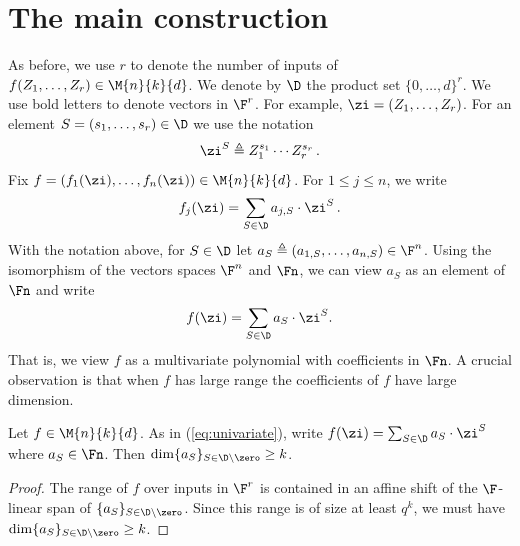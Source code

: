  \section{The main construction}\label{sec:main}
As before, we use $r$ to denote the number of inputs of $f(Z_1,\ldots,Z_r)\in\M{n}{k}{d}$.
We denote by $\D$ the product set $\{0,\ldots,d\}^r$.
We use bold letters to denote vectors in $\F^r$.
For example, $\zi = (Z_1,\ldots,Z_r)$.
For an element $S=(s_1,\ldots,s_r)\in \D$ we use the notation
\[\zi^{S}\triangleq Z_1^{s_1}\cdots Z_r^{s_r}\,.\]
Fix $f=(f_1(\zi),\ldots,f_n(\zi))\in \M{n}{k}{d}$.
For $1\leq j\leq n$, we write
\[f_j(\zi) = \sum_{S \in \D} a_{j,S} \cdot \zi^S\,.\]
With the notation above, for $S\in \D$ let $a_S\triangleq
(a_{1,S},\ldots,a_{n,S})\in \F^n$. Using the isomorphism of the
vectors spaces $\F^n$ and $\Fn$, we can view $a_S$ as an element
of $\Fn$ and write
\begin{equation}
  \label{eq:univariate}
f(\zi) = \sum_{S \in \D} a_S \cdot \zi^S.
\end{equation}
That is, we view $f$ as a multivariate polynomial with coefficients in $\Fn$.
A crucial observation is that when $f$ has large range the coefficients
of $f$ have large dimension.
\begin{lemma}\label{lem-spanofcoeff}
Let $f\in \M{n}{k}{d}$. As in (\ref{eq:univariate}), write $f(\zi)=\sum_{S\in \D} a_S\cdot
\zi^S$ where $a_S\in \Fn$. Then $\dim \{a_S\}_{ S\in \D\setminus \zero}\geq  k$.
\end{lemma}
\begin{proof}
The range of $f$ over inputs in $\F^r$ is contained in an affine
shift  of the $\F$-linear span of
$\{a_S\}_{S\in \D\setminus \zero}$. Since this range is of size at
least $q^k$, we must have $\dim \{a_S\}_{S\in \D\setminus
\zero}\geq  k$.
\end{proof}

%
%
%
%
%


